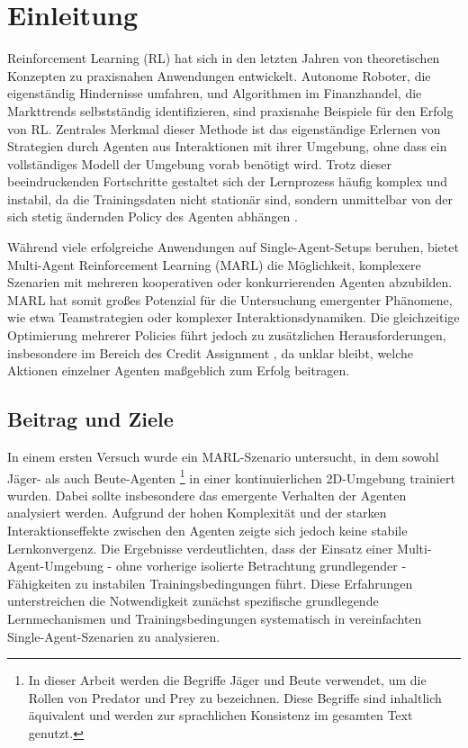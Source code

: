\chapter{Einleitung}
\label{chap:intro}
Reinforcement Learning (RL) hat sich in den letzten Jahren von theoretischen Konzepten zu praxisnahen Anwendungen entwickelt. Autonome Roboter, die eigenständig Hindernisse umfahren, und Algorithmen im Finanzhandel, die Markttrends selbstständig identifizieren, sind praxisnahe Beispiele für den Erfolg von RL. Zentrales Merkmal dieser Methode ist das eigenständige Erlernen von Strategien durch Agenten aus Interaktionen mit ihrer Umgebung, ohne dass ein vollständiges Modell der Umgebung vorab benötigt wird. Trotz dieser beeindruckenden Fortschritte gestaltet sich der Lernprozess häufig komplex und instabil, da die Trainingsdaten nicht stationär sind, sondern unmittelbar von der sich stetig ändernden Policy des Agenten abhängen \cite{sutton2018reinforcement}.

Während viele erfolgreiche Anwendungen auf Single-Agent-Setups beruhen, bietet Multi-Agent Reinforcement Learning (MARL) die Möglichkeit, komplexere Szenarien mit mehreren kooperativen oder konkurrierenden Agenten abzubilden. MARL hat somit großes Potenzial für die Untersuchung emergenter Phänomene, wie etwa Teamstrategien oder komplexer Interaktionsdynamiken. Die gleichzeitige Optimierung mehrerer Policies führt jedoch zu zusätzlichen Herausforderungen, insbesondere im Bereich des Credit Assignment \cite{sutton2018reinforcement}, da unklar bleibt, welche Aktionen einzelner Agenten maßgeblich zum Erfolg beitragen.
\section{Beitrag und Ziele}

In einem ersten Versuch wurde ein MARL-Szenario untersucht, in dem sowohl Jäger- als auch Beute-Agenten \footnote{In dieser Arbeit werden die Begriffe Jäger und Beute verwendet, um die Rollen von Predator und Prey zu bezeichnen. Diese Begriffe sind inhaltlich äquivalent und werden zur sprachlichen Konsistenz im gesamten Text genutzt.} in einer kontinuierlichen 2D-Umgebung trainiert wurden. Dabei sollte insbesondere das emergente Verhalten der Agenten analysiert werden. Aufgrund der hohen Komplexität und der starken Interaktionseffekte zwischen den Agenten zeigte sich jedoch keine stabile Lernkonvergenz. Die Ergebnisse verdeutlichten, dass der Einsatz einer Multi-Agent-Umgebung - ohne vorherige isolierte Betrachtung grundlegender - Fähigkeiten zu instabilen Trainingsbedingungen führt. Diese Erfahrungen unterstreichen die Notwendigkeit zunächst spezifische grundlegende Lernmechanismen und Trainingsbedingungen systematisch in vereinfachten Single-Agent-Szenarien zu analysieren.

